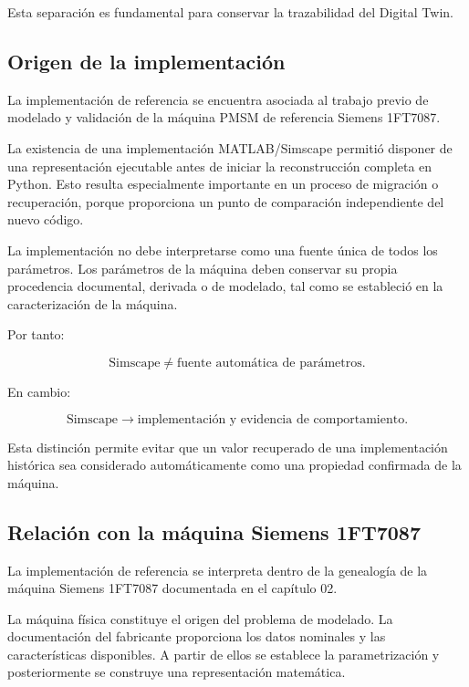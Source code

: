 Esta separación es fundamental para conservar la trazabilidad del Digital Twin.

\subsection{Origen de la implementación}

La implementación de referencia se encuentra asociada al trabajo previo de modelado y validación de la máquina PMSM de referencia Siemens 1FT7087.

La existencia de una implementación MATLAB/Simscape permitió disponer de una representación ejecutable antes de iniciar la reconstrucción completa en Python. Esto resulta especialmente importante en un proceso de migración o recuperación, porque proporciona un punto de comparación independiente del nuevo código.

La implementación no debe interpretarse como una fuente única de todos los parámetros. Los parámetros de la máquina deben conservar su propia procedencia documental, derivada o de modelado, tal como se estableció en la caracterización de la máquina.

Por tanto:

\begin{equation}
\text{Simscape}
\neq
\text{fuente automática de parámetros}.
\end{equation}

En cambio:

\begin{equation}
\text{Simscape}
\rightarrow
\text{implementación y evidencia de comportamiento}.
\end{equation}

Esta distinción permite evitar que un valor recuperado de una implementación histórica sea considerado automáticamente como una propiedad confirmada de la máquina.

\subsection{Relación con la máquina Siemens 1FT7087}

La implementación de referencia se interpreta dentro de la genealogía de la máquina Siemens 1FT7087 documentada en el capítulo 02.

La máquina física constituye el origen del problema de modelado. La documentación del fabricante proporciona los datos nominales y las características disponibles. A partir de ellos se establece la parametrización y posteriormente se construye una representación matemática.

